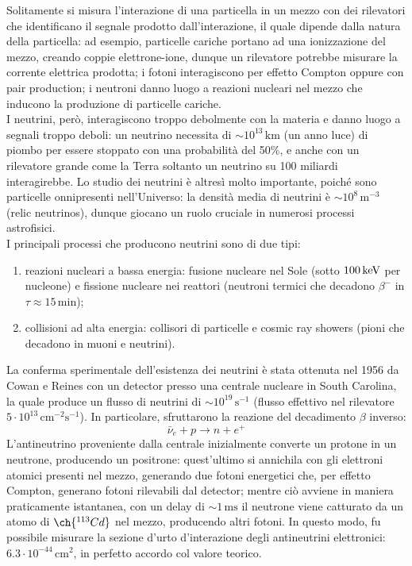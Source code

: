 Solitamente si misura l'interazione di una particella in un mezzo con dei rilevatori che identificano il segnale prodotto dall'interazione, il quale dipende dalla natura della particella: ad esempio, particelle cariche portano ad una ionizzazione del mezzo, creando coppie elettrone-ione, dunque un rilevatore potrebbe misurare la corrente elettrica prodotta; i fotoni interagiscono per effetto Compton oppure con pair production; i neutroni danno luogo a reazioni nucleari nel mezzo che inducono la produzione di particelle cariche.\\
I neutrini, però, interagiscono troppo debolmente con la materia e danno luogo a segnali troppo deboli: un neutrino necessita di $ \sim 10^{13}\,\text{km} $ (un anno luce) di piombo per essere stoppato con una probabilità del 50\%, e anche con un rilevatore grande come la Terra soltanto un neutrino su 100 miliardi interagirebbe. Lo studio dei neutrini è altresì molto importante, poiché sono particelle onnipresenti nell'Universo: la densità media di neutrini è $ \sim 10^8 \,\text{m}^{-3} $ (relic neutrinos), dunque giocano un ruolo cruciale in numerosi processi astrofisici.\\
I principali processi che producono neutrini sono di due tipi:
\begin{enumerate}
	\item reazioni nucleari a bassa energia: fusione nucleare nel Sole (sotto $ 100\,\mathrm{keV} $ per nucleone) e fissione nucleare nei reattori (neutroni termici che decadono $ \beta^- $ in $ \tau \approx 15\,\text{min} $);
	\item collisioni ad alta energia: collisori di particelle e cosmic ray showers (pioni che decadono in muoni e neutrini).
\end{enumerate}
La conferma sperimentale dell'esistenza dei neutrini è stata ottenuta nel 1956 da Cowan e Reines con un detector presso una centrale nucleare in South Carolina, la quale produce un flusso di neutrini di $ \sim 10^{19} \,\text{s}^{-1} $ (flusso effettivo nel rilevatore $ 5\cdot10^{13}\,\text{cm}^{-2}\text{s}^{-1} $). In particolare, sfruttarono la reazione del decadimento $ \beta $ inverso:
\begin{equation*}
	\bar{\nu}_e + p \rightarrow n + e^+
\end{equation*}
L'antineutrino proveniente dalla centrale inizialmente converte un protone in un neutrone, producendo un positrone: quest'ultimo si annichila con gli elettroni atomici presenti nel mezzo, generando due fotoni energetici che, per effetto Compton, generano fotoni rilevabili dal detector; mentre ciò avviene in maniera praticamente istantanea, con un delay di $ \sim 1\,\text{ms} $ il neutrone viene catturato da un atomo di $ \ch{^{113}Cd} $ nel mezzo, producendo altri fotoni. In questo modo, fu possibile misurare la sezione d'urto d'interazione degli antineutrini elettronici: $ 6.3\cdot10^{-44} \,\text{cm}^2 $, in perfetto accordo col valore teorico.\\
